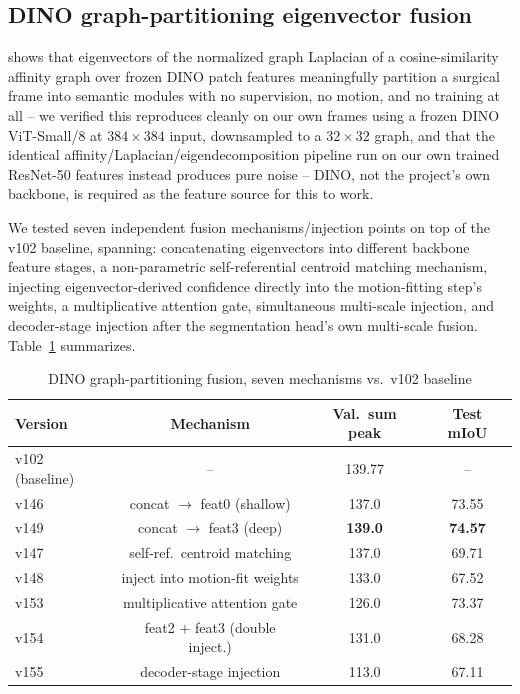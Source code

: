 \documentclass[conference]{IEEEtran}
\begin{document}
\subsection{DINO graph-partitioning eigenvector fusion}
\label{sec:dino_graph}

\cite{graphpartition_mchm2024} shows that eigenvectors of the normalized
graph Laplacian of a cosine-similarity affinity graph over frozen DINO
patch features meaningfully partition a surgical frame into semantic
modules with no supervision, no motion, and no training at all -- we
verified this reproduces cleanly on our own frames using a frozen DINO
ViT-Small/8 at $384\!\times\!384$ input, downsampled to a $32\!\times\!32$
graph, and that the identical affinity/Laplacian/eigendecomposition
pipeline run on our own trained ResNet-50 features instead produces pure
noise -- DINO, not the project's own backbone, is required as the feature
source for this to work.

We tested seven independent fusion mechanisms/injection points on top of
the v102 baseline, spanning: concatenating eigenvectors into different
backbone feature stages, a non-parametric self-referential centroid
matching mechanism, injecting eigenvector-derived confidence directly
into the motion-fitting step's weights, a multiplicative attention gate,
simultaneous multi-scale injection, and decoder-stage injection after the
segmentation head's own multi-scale fusion. Table~\ref{tab:dino_batch}
summarizes.

\begin{table}[htbp]
\caption{DINO graph-partitioning fusion, seven mechanisms vs.\ v102 baseline}
\label{tab:dino_batch}
\centering
\begin{tabular}{lccc}
\toprule
Version & Mechanism & Val.\ sum peak & Test mIoU \\
\midrule
v102 (baseline) & -- & 139.77 & -- \\
v146 & concat $\to$ feat0 (shallow) & 137.0 & 73.55 \\
v149 & concat $\to$ feat3 (deep) & \textbf{139.0} & \textbf{74.57} \\
v147 & self-ref.\ centroid matching & 137.0 & 69.71 \\
v148 & inject into motion-fit weights & 133.0 & 67.52 \\
v153 & multiplicative attention gate & 126.0 & 73.37 \\
v154 & feat2 $+$ feat3 (double inject.) & 131.0 & 68.28 \\
v155 & decoder-stage injection & 113.0 & 67.11 \\
\bottomrule
\end{tabular}
\end{table}
\end{document}
